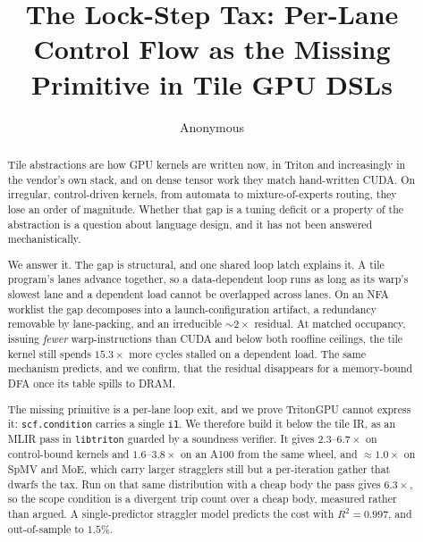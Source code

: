 \documentclass[sigplan,anonymous,review,nonacm,10pt]{acmart}
\begin{document}
\title{The Lock-Step Tax: Per-Lane Control Flow as the Missing Primitive in Tile GPU DSLs}
\author{Anonymous}
\renewcommand{\shortauthors}{Anonymous}

\begin{abstract}
Tile abstractions are how GPU kernels are written now, in Triton and increasingly in the
vendor's own stack, and on dense tensor work they match hand-written CUDA. On irregular,
control-driven kernels, from automata to mixture-of-experts routing, they lose an order of
magnitude. Whether that gap is a tuning
deficit or a property of the abstraction is a question about language design, and it has
not been answered mechanistically.

We answer it. The gap is structural, and one shared loop latch explains it. A tile
program's lanes advance together, so a data-dependent loop runs as long as its warp's
slowest lane and a dependent load cannot be overlapped across lanes. On an NFA worklist
the gap decomposes into a launch-configuration artifact, a redundancy removable by
lane-packing, and an irreducible ${\sim}2\times$ residual. At matched occupancy, issuing
\emph{fewer} warp-instructions than CUDA and below both roofline ceilings, the tile kernel
still spends $15.3\times$ more cycles stalled on a dependent load. The same mechanism
predicts, and we confirm, that the residual disappears for a memory-bound DFA once its
table spills to DRAM.

The missing primitive is a per-lane loop exit, and we prove TritonGPU cannot express it:
\texttt{scf.condition} carries a single \texttt{i1}. We therefore build it below the tile
IR, as an MLIR pass in \texttt{libtriton} guarded by a soundness verifier. It gives
$2.3$--$6.7\times$ on control-bound kernels and $1.6$--$3.8\times$ on an A100 from the same
wheel, and ${\approx}1.0\times$ on SpMV and MoE, which carry larger stragglers still but a
per-iteration gather that dwarfs the tax. Run on that same distribution with a cheap body
the pass gives $6.3\times$, so the scope condition is a divergent trip count over a cheap
body, measured rather than argued. A single-predictor straggler model predicts the cost with $R^2=0.997$, and
out-of-sample to $1.5\%$.
\end{abstract}
\end{document}
